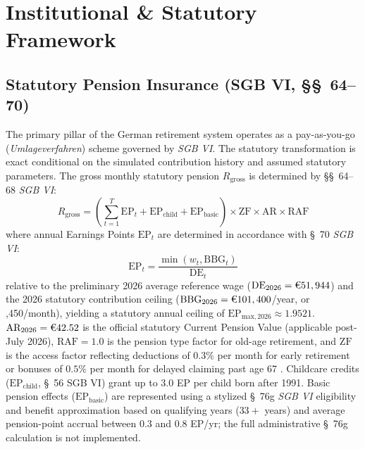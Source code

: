 \documentclass[conference]{IEEEtran}
\begin{document}
\section{Institutional \& Statutory Framework}

\subsection{Statutory Pension Insurance (SGB VI, \S\S~64--70)}
The primary pillar of the German retirement system operates as a pay-as-you-go (\textit{Umlageverfahren}) scheme governed by \textit{SGB VI}. The statutory transformation is exact conditional on the simulated contribution history and assumed statutory parameters. The gross monthly statutory pension $R_{\text{gross}}$ is determined by \S\S~64--68 \textit{SGB VI}:
\begin{equation}
    R_{\text{gross}} = \left( \sum_{t=1}^{T} \text{EP}_t + \text{EP}_{\text{child}} + \text{EP}_{\text{basic}} \right) \times \text{ZF} \times \text{AR} \times \text{RAF}
    \label{eq:pension_formula}
\end{equation}
where annual Earnings Points $\text{EP}_t$ are determined in accordance with \S~70 \textit{SGB VI}:
\begin{equation}
    \text{EP}_t = \frac{\min(w_t, \text{BBG}_t)}{\text{DE}_t}
\end{equation}
relative to the preliminary 2026 average reference wage ($\text{DE}_{2026} = \text{\texteuro}51,944$) and the 2026 statutory contribution ceiling ($\text{BBG}_{2026} = \text{\texteuro}101,400$/year, or ,450/month), yielding a statutory annual ceiling of $\text{EP}_{\text{max}, 2026} \approx 1.9521$. $\text{AR}_{2026} = \text{\texteuro}42.52$ is the official statutory Current Pension Value (applicable post-July 2026), $\text{RAF} = 1.0$ is the pension type factor for old-age retirement, and $\text{ZF}$ is the access factor reflecting deductions of $0.3\%$ per month for early retirement or bonuses of $0.5\%$ per month for delayed claiming past age 67 \cite{drv2025rentenatlas}. Childcare credits ($\text{EP}_{\text{child}}$, \S~56 SGB VI) grant up to 3.0 EP per child born after 1991. Basic pension effects ($\text{EP}_{\text{basic}}$) are represented using a stylized \S~76g \textit{SGB VI} eligibility and benefit approximation based on qualifying years ($33+$ years) and average pension-point accrual between 0.3 and 0.8 EP/yr; the full administrative \S~76g calculation is not implemented.
\end{document}
